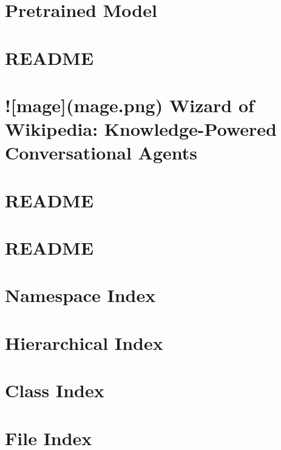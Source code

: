 \documentclass[twoside]{book}
\newcommand{\+}{\discretionary{\mbox{\scriptsize$\hookleftarrow$}}{}{}}
\begin{document}
\chapter{Pretrained Model}
\label{md_projects_twitter_seq2seq_README}

\chapter{R\+E\+A\+D\+ME}
\label{md_projects_wizard_of_wikipedia_mturk_evaluation_task_README}

\chapter{!\mbox{[}mage\mbox{]}(mage.\+png) Wizard of Wikipedia\+: Knowledge-\/\+Powered Conversational Agents}
\label{md_projects_wizard_of_wikipedia_README}

\chapter{R\+E\+A\+D\+ME}
\label{md_README}

\chapter{R\+E\+A\+D\+ME}
\label{md_website_README}

\chapter{Namespace Index}

\chapter{Hierarchical Index}

\chapter{Class Index}

\chapter{File Index}

\end{document}
